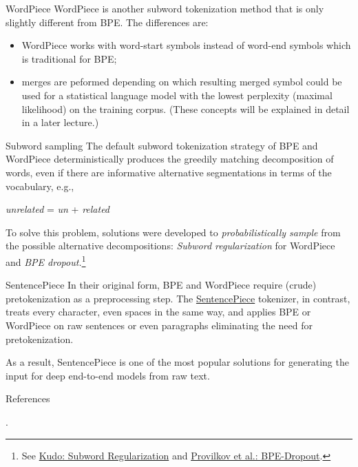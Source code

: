 \documentclass[style=upen, size=14pt]{powerdot}
\theoremstyle{definition}
\begin{document}
\begin{slide}[toc=WordPiece]{WordPiece}
  WordPiece is another subword tokenization method that is only slightly
  different from BPE. The differences are:
  \begin{itemize}
  \item WordPiece works with word-start symbols instead of word-end symbols which is
    traditional for BPE;
  \item merges are peformed depending on which resulting merged symbol could be
    used for a statistical language model with the lowest perplexity (maximal
    likelihood) on the training corpus. (These concepts will be explained in
    detail in a later lecture.)
  \end{itemize}
\end{slide}

\begin{slide}[toc=Subword sampling]{Subword sampling}
  The default subword tokenization strategy of BPE and WordPiece
  deterministically produces the greedily matching decomposition of words, even
  if there are informative alternative segmentations in terms of the vocabulary,
  e.g.,
  \begin{center}
    \emph{unrelated} = \emph{un} + \emph{related}
  \end{center}
  To solve this problem, solutions were developed to \emph{probabilistically
    sample} from the possible alternative decompositions: \emph{Subword
    regularization} for WordPiece and \emph{BPE dropout.}\footnote{See \href{https://arxiv.org/pdf/1804.10959.pdf}{Kudo: Subword Regularization} and \href{https://arxiv.org/pdf/1910.13267.pdf}{Provilkov et al.: BPE-Dropout}.}
\end{slide}

\begin{slide}[toc=SentencePiece]{SentencePiece}
  In their original form, BPE and WordPiece require (crude) pretokenization as a
  preprocessing step. The
  \href{https://github.com/google/sentencepiece}{SentencePiece} tokenizer, in
  contrast, treats every character, even spaces in the same way, and applies BPE
  or WordPiece on raw sentences or even paragraphs eliminating the need for
  pretokenization.

  As a result, SentencePiece is one of the most popular solutions for generating
  the input for deep end-to-end models from raw text.
\end{slide}

\begin{slide}{References}
  
  \begin{footnotesize}

    .\medskip

  \end{footnotesize}
\end{slide}
\end{document}
